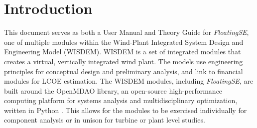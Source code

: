 \section{Introduction}
\label{sec:intro}
This document serves as both a User Manual and Theory Guide for
\textit{FloatingSE}, one of multiple modules within the Wind-Plant Integrated
System Design and Engineering Model (WISDEM).  WISDEM is a set of
integrated modules that creates a virtual, vertically integrated wind
plant. The models use engineering principles for conceptual design and
preliminary analysis, and link to financial modules for LCOE estimation.
The WISDEM modules, including \textit{FloatingSE}, are built around the OpenMDAO
library, an open-source high-performance computing platform for systems
analysis and multidisciplinary optimization, written in Python
\citep{openmdao}.  This allows for the modules to be exercised
individually for component analysis or in unison for turbine or plant
level studies.
